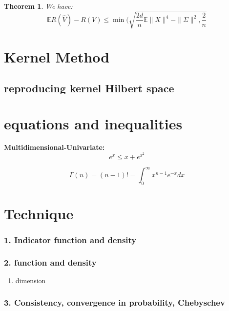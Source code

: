 \documentclass[a4paper,12pt, oneside, fleqn]{book}
\newtheorem{theorem}{Theorem}[section]
\theoremstyle{definition}
\theoremstyle{remark}
\begin{document}
\begin{theorem}
	We have:
	\begin{equation*}
		\mathbb{E}R(\hat{V}) - R(V) \leq \min (\sqrt{\frac{2d}{n}\mathbb{E}\|X\|^4 - \|\Sigma\|^2, \frac{2}{n} }
	\end{equation*}

\end{theorem}


\section{Kernel Method}
\subsection{reproducing kernel Hilbert space}




\section*{equations and inequalities}
\textbf{Multidimensional-Univariate:}
\begin{equation*}
	e^x \leq x + e^{x^2}
\end{equation*}

\begin{equation*}
	\Gamma(n) = (n - 1)! = \int_0^\infty x^{n -1} e^{-x} dx
\end{equation*}

\section{Technique}

\subsubsection*{1. Indicator function and density}

\subsubsection*{2. function and density}
\begin{enumerate}
	\item dimension
\end{enumerate}

\subsubsection*{3. Consistency, convergence in probability, Chebyschev}
\end{document}
